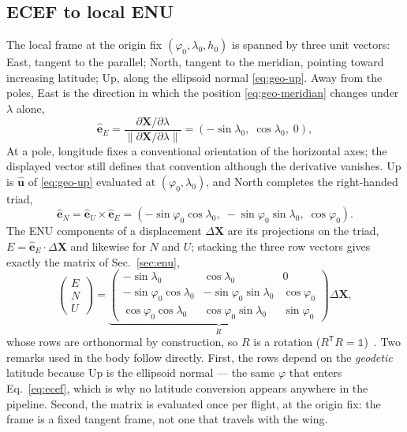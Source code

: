 \begin{revblock}
\section{ECEF to local ENU}
\label{app:geodesy-enu}

The local frame at the origin fix $(\varphi_0,\lambda_0,h_0)$ is spanned by three unit
vectors: East, tangent to the parallel; North, tangent to the meridian, pointing toward increasing latitude; Up, along the ellipsoid normal \eqref{eq:geo-up}. Away from the poles, East is the direction in which the
position \eqref{eq:geo-meridian} changes under $\lambda$ alone,
\begin{equation}
\hat{\mathbf{e}}_E=\frac{\partial\mathbf{X}/\partial\lambda}
                        {\lVert\partial\mathbf{X}/\partial\lambda\rVert}
=(-\sin\lambda_0,\;\cos\lambda_0,\;0),
\end{equation}
At a pole, longitude fixes a conventional orientation of the horizontal axes;
the displayed vector still defines that convention although the derivative vanishes.
Up is $\hat{\mathbf{u}}$ of \eqref{eq:geo-up} evaluated at
$(\varphi_0,\lambda_0)$, and North completes the right-handed triad,
\begin{equation}
\hat{\mathbf{e}}_N=\hat{\mathbf{e}}_U\times\hat{\mathbf{e}}_E
=(-\sin\varphi_0\cos\lambda_0,\;-\sin\varphi_0\sin\lambda_0,\;\cos\varphi_0).
\end{equation}
The ENU components of a displacement $\Delta\mathbf{X}$ are its projections on the triad,
$E=\hat{\mathbf{e}}_E\!\cdot\!\Delta\mathbf{X}$ and likewise for $N$ and $U$; stacking the
three row vectors gives exactly the matrix of Sec.~\ref{sec:enu},
\begin{equation}
\begin{pmatrix}E\\N\\U\end{pmatrix}=
\underbrace{\begin{pmatrix}
-\sin\lambda_0 & \cos\lambda_0 & 0\\
-\sin\varphi_0\cos\lambda_0 & -\sin\varphi_0\sin\lambda_0 & \cos\varphi_0\\
\cos\varphi_0\cos\lambda_0 & \cos\varphi_0\sin\lambda_0 & \sin\varphi_0
\end{pmatrix}}_{\textstyle R\,}
\Delta\mathbf{X},
\end{equation}
whose rows are orthonormal by construction, so $R$ is a rotation
($R^{\mathsf T}R=\mathbb{1}$)~\cite{esa_navipedia_ellipsoidal_cartesian}. Two remarks used
in the body follow directly. First, the rows depend on the \emph{geodetic} latitude
because Up is the ellipsoid normal --- the same $\varphi$ that enters
Eq.~\eqref{eq:ecef}, which is why no latitude conversion appears anywhere in the
pipeline. Second, the matrix is evaluated once per flight, at the origin fix: the frame
is a fixed tangent frame, not one that travels with the wing.


\end{revblock}
